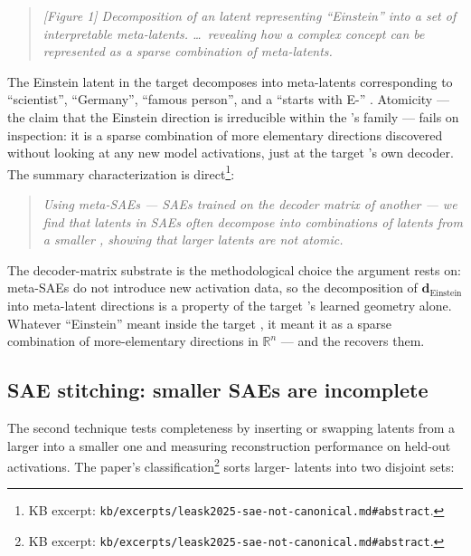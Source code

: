 \begin{quote}
\itshape
[Figure 1] Decomposition of an  latent representing ``Einstein''
into a set of interpretable meta-latents. \dots\ revealing how a
complex concept can be represented as a sparse combination of
meta-latents.~\citep[\S 1]{leask2025-sae-not-canonical}
\end{quote}

\noindent The Einstein latent in the target  decomposes into
meta-latents corresponding to ``scientist'', ``Germany'', ``famous
person'', and a ``starts with E-'' . Atomicity --- the claim
that the Einstein direction is irreducible within the 's 
family --- fails on inspection: it is a sparse combination of more
elementary directions discovered without looking at any new model
activations, just at the target 's own decoder. The summary
characterization is direct\footnote{KB excerpt:
\nolinkurl{kb/excerpts/leask2025-sae-not-canonical.md#abstract}.}:

\begin{quote}
\itshape
Using meta-SAEs --- SAEs trained on the decoder matrix of another
 --- we find that latents in SAEs often decompose into
combinations of latents from a smaller , showing that larger 
latents are not atomic.~\citep[abstract]{leask2025-sae-not-canonical}
\end{quote}

\noindent The decoder-matrix substrate is the methodological
choice the argument rests on: meta-SAEs do not introduce new activation data, so the
decomposition of $\mathbf{d}_\text{Einstein}$ into meta-latent
directions is a property of the target 's learned geometry alone.
Whatever ``Einstein'' meant inside the target , it meant it as a
sparse combination of more-elementary directions in
$\mathbb{R}^n$ --- and the  recovers them.

\subsection{SAE stitching: smaller SAEs are incomplete}
\label{sec:sae-stitching}

The second technique tests completeness by inserting or swapping
latents from a larger  into a smaller one and measuring
reconstruction performance on held-out activations. The paper's
classification\footnote{KB excerpt:
\nolinkurl{kb/excerpts/leask2025-sae-not-canonical.md#abstract}.} sorts
larger- latents into two disjoint sets:

